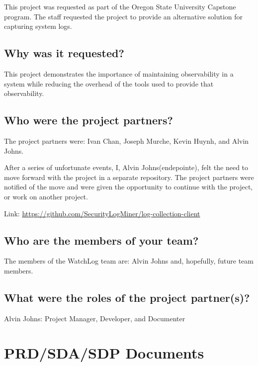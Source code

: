 \documentclass{article}
\begin{document}
This project was requested as part of the Oregon State University Capstone program. The staff requested the project to provide an alternative solution for capturing system logs.

\subsection{Why was it requested?}

This project demonstrates the importance of maintaining observability in a system while reducing the overhead of the tools used to provide that observability.

\subsection{Who were the project partners?}

The project partners were: Ivan Chan, Joseph Murche, Kevin Huynh, and Alvin Johns.\vspace{0.25cm}

After a series of unfortunate events, I, Alvin Johns(endepointe), felt the need to move forward with the project in a separate repository. The project partners were notified of the move and were given the opportunity to continue with the project, or work on another project.\vspace{0.25cm}

Link: \url{https://github.com/SecurityLogMiner/log-collection-client}

\subsection{Who are the members of your team?}

The members of the WatchLog team are: Alvin Johns and, hopefully, future team members.

\subsection{What were the roles of the project partner(s)?}

Alvin Johns: Project Manager, Developer, and Documenter

\newpage

\section{PRD/SDA/SDP Documents}
\end{document}
